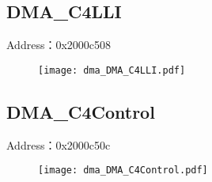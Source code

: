 \subsection{DMA\_C4LLI}
\label{dma-DMA-C4LLI}
Address：0x2000c508
 \begin{figure}[H]
\texttt{[image: dma\_DMA\_C4LLI.pdf]}
\end{figure}

\subsection{DMA\_C4Control}
\label{dma-DMA-C4Control}
Address：0x2000c50c
 \begin{figure}[H]
\texttt{[image: dma\_DMA\_C4Control.pdf]}
\end{figure}

